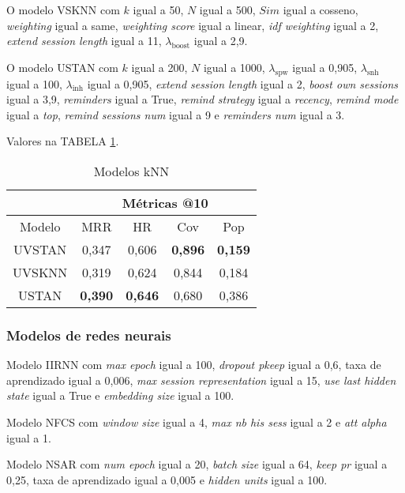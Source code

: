 O modelo VSKNN com $k$ igual a 50, $N$ igual a 500, $Sim$ igual a cosseno,
\textit{weighting} igual a same, \textit{weighting score} igual a linear,
\textit{idf weighting} igual a 2, \textit{extend session length} igual a 11,
$\lambda_{\text{boost}}$ igual a 2,9.

O modelo USTAN com $k$ igual a 200, $N$ igual a 1000, $\lambda_{\text{spw}}$
igual a 0,905, $\lambda_{\text{snh}}$ igual a 100, $\lambda_{\text{inh}}$ igual a
0,905, \textit{extend session length} igual a 2, \textit{boost own sessions}
igual a 3,9, \textit{reminders} igual a True, \textit{remind strategy} igual a
\textit{recency}, \textit{remind mode} igual a \textit{top}, \textit{remind
sessions num} igual a 9 e \textit{reminders num} igual a 3.

Valores na TABELA \ref{app:knn_models_aware}.

\begin{table}
  \centering
  \begin{tabular}{|c|c|c|c|c|}
      \hline
      \multicolumn{1}{|c|}{} & \multicolumn{4}{c|}{Métricas @10} \\
      \hline
      Modelo & MRR & HR & Cov & Pop \\
      \hline
      UVSTAN & 0,347 & 0,606 & \textbf{0,896} & \textbf{0,159} \\
      \hline
      UVSKNN & 0,319 & 0,624 & 0,844 & 0,184 \\
      \hline
      USTAN & \textbf{0,390} & \textbf{0,646} & 0,680 & 0,386 \\
      \hline
      \end{tabular} \label{app:knn_models_aware}
      \caption{Modelos kNN}
\end{table}

\subsubsection{Modelos de redes neurais}
Modelo IIRNN com \textit{max epoch} igual a 100, \textit{dropout pkeep} igual a
0,6, taxa de aprendizado igual a 0,006, \textit{max session representation} igual
a 15, \textit{use last hidden state} igual a True e \textit{embedding size} igual
a 100.

Modelo NFCS com \textit{window size} igual a 4, \textit{max nb his sess} igual a
2 e \textit{att alpha} igual a 1.

Modelo NSAR com \textit{num epoch} igual a 20, \textit{batch size} igual a 64,
\textit{keep pr} igual a 0,25, taxa de aprendizado igual a 0,005 e \textit{hidden
units} igual a 100.

